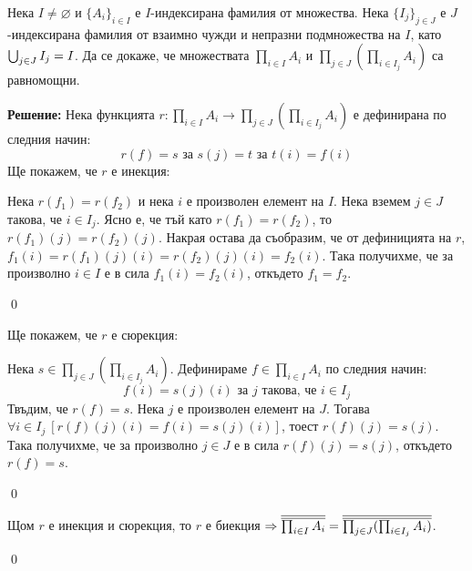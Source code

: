 \begin{problem}
Нека $I \ne \varnothing$ и $\{A_i\}_{i \in I}$ е $I$-индексирана фамилия от множества.
Нека $\{I_j\}_{j \in J}$ е $J$-индексирана фамилия от взаимно чужди и непразни подмножества на $I$,
като $\bigcup_{j \in J} I_j = I$.
Да се докаже, че множествата
$\prod_{i \in I} A_i$ и $\prod_{j \in J}(\prod_{i \in I_j} A_i)$ са равномощни.
\end{problem}

\textbf{Решение:}
\smallbreak
\quad
Нека функцията $r: \prod_{i \in I} A_i \to \prod_{j \in J}(\prod_{i \in I_j} A_i)$ е дефинирана по следния начин:
\[
r(f) = s \text{ за }
s(j) = t \text{ за }
t(i) = f(i)
\]
\quad
Ще покажем, че $r$ е инекция:

\begin{tcolorbox}[mybox={Доказателство:}]
\quad
Нека $r(f_1) = r(f_2)$ и нека $i$ е произволен елемент на $I$.
Нека вземем $j \in J$ такова, че $i \in I_j$.
Ясно е, че тъй като $r(f_1) = r(f_2)$, то $r(f_1)(j) = r(f_2)(j)$.
Накрая остава да съобразим, че от дефиницията на $r$,
$f_1(i) = r(f_1)(j)(i) = r(f_2)(j)(i) = f_2(i)$.
Така получихме, че за произволно $i \in I$ е в сила $f_1(i) = f_2(i)$, откъдето
$f_1 = f_2$.

\qed
\end{tcolorbox}

\quad
Ще покажем, че $r$ е сюрекция:

\begin{tcolorbox}[mybox={Доказателство:}]
\quad
Нека $s \in \prod_{j \in J}(\prod_{i \in I_j} A_i)$.
Дефинираме $f \in \prod_{i \in I} A_i$ по следния начин:
\[
f(i) = s(j)(i) \text{ за $j$ такова, че } i \in I_j
\]
\quad
Твъдим, че $r(f) = s$. Нека $j$ е произволен елемент на $J$.
Тогава $\forall i \in I_j\ [r(f)(j)(i) = f(i) = s(j)(i)]$, тоест $r(f)(j) = s(j)$.
Така получихме, че за произволно $j \in J$ е в сила
$r(f)(j) = s(j)$, откъдето $r(f) = s$.

\qed
\end{tcolorbox}


\quad
Щом $r$ е инекция и сюрекция, то $r$ е биекция
$\Rightarrow \overline{\overline{\prod_{i \in I} A_i}} = \overline{\overline{\prod_{j \in J}(\prod_{i \in I_j} A_i)}}$.

\qed
